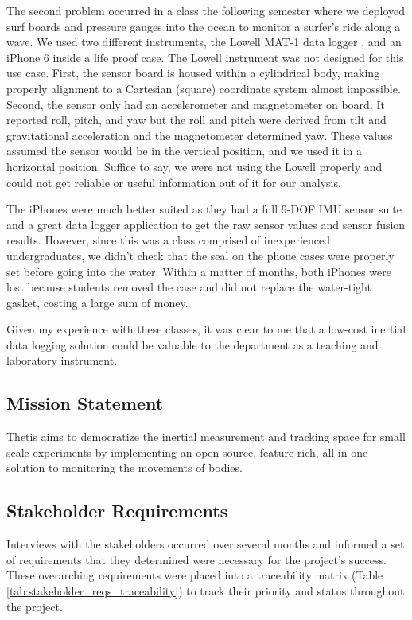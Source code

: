 The second problem occurred in a class the following semester where we deployed surf boards and pressure gauges into the ocean to monitor a surfer's ride along a wave.
We used two different instruments, the Lowell MAT-1 data logger \cite{lowell}, and an iPhone 6 inside a life proof case.
The Lowell instrument was not designed for this use case.
First, the sensor board is housed within a cylindrical body, making properly alignment to a Cartesian (square) coordinate system almost impossible.
Second, the sensor only had an accelerometer and magnetometer on board.
It reported roll, pitch, and yaw but the roll and pitch were derived from tilt and gravitational acceleration and the magnetometer determined yaw.
These values assumed the sensor would be in the vertical position, and we used it in a horizontal position.
Suffice to say, we were not using the Lowell properly and could not get reliable or useful information out of it for our analysis.

The iPhones were much better suited as they had a full 9-DOF IMU sensor suite and a great data logger application to get the raw sensor values and sensor fusion results.
However, since this was a class comprised of inexperienced undergraduates, we didn't check that the seal on the phone cases were properly set before going into the water.
Within a matter of months, both iPhones were lost because students removed the case and did not replace the water-tight gasket, costing a large sum of money.

Given my experience with these classes, it was clear to me that a low-cost inertial data logging solution could be valuable to the department as a teaching and laboratory instrument.

\subsection{Mission Statement} 
Thetis aims to democratize the inertial measurement and tracking space for small scale experiments by implementing an open-source, feature-rich, all-in-one solution to monitoring the movements of bodies.

\subsection{Stakeholder Requirements} 
Interviews with the stakeholders occurred over several months and informed a set of requirements that they determined were necessary for the project's success.
These overarching requirements were placed into a traceability matrix (Table \ref{tab:stakeholder_reqs_traceability}) to track their priority and status throughout the project.

